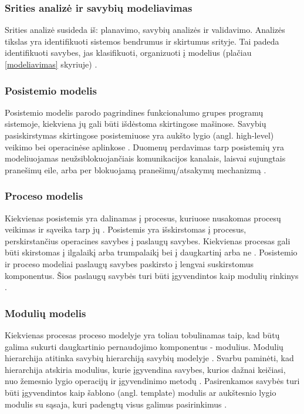 \documentclass{VUMIFPSbakalaurinis}
\begin{document}
\subsubsection{Srities analizė ir  savybių modeliavimas}

Srities analizė susideda iš: planavimo, savybių analizės ir validavimo. Analizės tikslas yra identifikuoti sistemos bendrumus ir skirtumus srityje. Tai padeda identifikuoti savybes, jas klasifikuoti, organizuoti į modelius (plačiau \ref{modeliavimas} skyriuje) \cite{Kang}.


\subsubsection{Posistemio modelis}

Posistemio modelis parodo pagrindines funkcionalumo grupes programų sistemoje, kiekviena jų gali būti išdėstoma skirtingose mašinose.  Savybių pasiskirstymas skirtingose posistemiuose yra aukšto lygio (angl. high-level) veikimo bei operacinėse aplinkose \cite{Lee2000}. Duomenų perdavimas tarp posistemių yra modeliuojamas neužsiblokuojančiais komunikacijos kanalais, laisvai sujungtais pranešimų eile, arba per blokuojamą pranešimų/atsakymų mechanizmą \cite{Kang}.

\subsubsection{Proceso modelis}

Kiekvienas posistemis yra dalinamas į procesus, kuriuose nusakomas procesų veikimas ir sąveika tarp jų \cite{Lee2000}. Posistemis yra išskirstomas į procesus, perskirstančius operacines savybes į paslaugų savybes. Kiekvienas procesas gali būti skirstomas į ilgalaikį arba trumpalaikį bei į daugkartinį arba ne \cite{Kang}. Posistemio ir proceso modeliai paslaugų savybes paskirsto į lengvai suskirstomus komponentus. Šios paslaugų savybės turi būti įgyvendintos kaip modulių rinkinys \cite{Kang1999}.

\subsubsection{Modulių modelis}

Kiekvienas procesas proceso modelyje yra toliau tobulinamas taip, kad būtų galima sukurti daugkartinio pernaudojimo komponentus - modulius. Modulių hierarchija atitinka savybių hierarchiją savybių modelyje \cite{Lee2000}. Svarbu paminėti, kad hierarchija atskiria modulius, kurie įgyvendina savybes, kurios dažnai keičiasi, nuo žemesnio lygio operacijų ir įgyvendinimo metodų \cite{Kang1999}. Pasirenkamos savybės turi būti įgyvendintos kaip šablono (angl. template) modulis ar aukštesnio lygio modulis su sąsaja, kuri padengtų visus galimus pasirinkimus \cite{Kang}.
\end{document}
